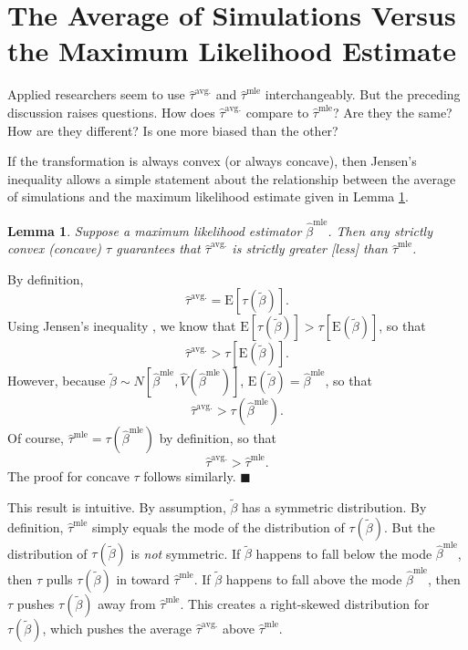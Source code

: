 \documentclass[10pt]{article}
\newtheorem{lemma}{Lemma}
\newenvironment{proof}[1][Proof]{\begin{trivlist}
\item[\hskip \labelsep {\bfseries #1}]}{\end{trivlist}}
\begin{document}
\section*{The Average of Simulations Versus the Maximum Likelihood Estimate}

Applied researchers seem to use $\hat{\tau}^\text{avg.}$ and $\hat{\tau}^\text{mle}$ interchangeably. 
But the preceding discussion raises questions. How does $\hat{\tau}^{\text{avg.}}$ compare to $\hat{\tau}^{\text{mle}}$? Are they the same? How are they different? Is one more biased than the other? 

If the transformation is always convex (or always concave), then Jensen's inequality allows a simple statement about the relationship between the average of simulations and the maximum likelihood estimate given in Lemma \ref{lem:direction}.

\begin{lemma}\label{lem:direction}
Suppose a maximum likelihood estimator $\hat{\beta}^\text{mle}$. 
Then any strictly convex (concave) $\tau$ guarantees that $\hat{\tau}^{\text{avg.}}$ is strictly greater [less] than $\hat{\tau}^\text{mle}$.
\end{lemma} 
\begin{proof}
By definition, $$ \hat{\tau}^{\text{avg.}} = \text{E}\left[ \tau \left(\tilde{\beta} \right) \right].$$
Using Jensen's inequality \citep[p. 190, Thm. 4.7.7]{CasellaBerger2002}, we know that $\text{E}\left[ \tau \left(\tilde{\beta} \right) \right] > \tau \left[ \text{E}\left( \tilde{\beta} \right) \right]$, so that $$\hat{\tau}^{\text{avg.}} > \tau \left[ \text{E}\left( \tilde{\beta} \right) \right].$$ 
However, because $\tilde{\beta} \sim N \left[ \hat{\beta}^{\text{mle}}, \hat{V} \left( \hat{\beta}^{\text{mle}} \right) \right]$, $\text{E}\left( \tilde{\beta} \right) = \hat{\beta}^\text{mle}$, so that 
$$\hat{\tau}^{\text{avg.}} > \tau \left( \hat{\beta}^\text{mle}\right).$$ 
Of course, $\hat{\tau}^\text{mle} = \tau \left( {\hat{\beta}^\text{mle}} \right)$ by definition, so that $$\hat{\tau}^{\text{avg.}} > \hat{\tau}^\text{mle}.$$ 
The proof for concave $\tau$ follows similarly.
 $\blacksquare$
\end{proof}
This result is intuitive. 
By assumption, $\tilde{\beta}$ has a symmetric distribution. 
By definition, $\hat{\tau}^\text{mle}$ simply equals the mode of the distribution of $\tau(\tilde{\beta})$.  
But the distribution of $\tau(\tilde{\beta})$ is \emph{not} symmetric.
If $\tilde{\beta}$ happens to fall below the mode $\hat{\beta}^\text{mle}$, then $\tau$ pulls $\tau(\tilde{\beta})$ in toward $\hat{\tau}^\text{mle}$. 
If $\tilde{\beta}$ happens to fall above the mode $\hat{\beta}^\text{mle}$, then $\tau$ pushes $\tau(\tilde{\beta})$ away from $\hat{\tau}^\text{mle}$. 
This creates a right-skewed distribution for $\tau(\tilde{\beta})$, which pushes the average $\hat{\tau}^\text{avg.}$ above $\hat{\tau}^\text{mle}$.
\end{document}
